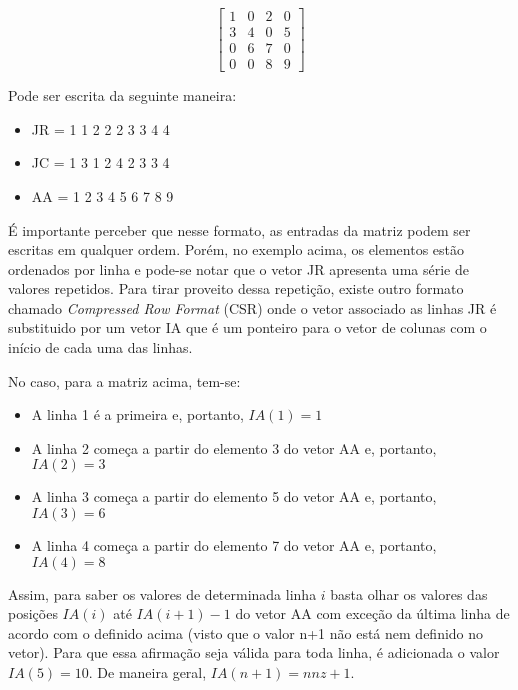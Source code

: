 \begin{equation}
    \begin{bmatrix}
        1 & 0 & 2 & 0\\
        3 & 4 & 0 & 5\\
        0 & 6 & 7 & 0\\
        0 & 0 & 8 &9
    \end{bmatrix}
\end{equation}

Pode ser escrita da seguinte maneira:


\begin{center}
    \begin{itemize}
        \item  JR = 1 1 2 2 2 3 3 4 4
        \item  JC = 1 3 1 2 4 2 3 3 4
        \item  AA = 1 2 3 4 5 6 7 8 9
    \end{itemize}
\end{center}


É importante perceber que nesse formato, as entradas da matriz podem ser escritas em qualquer ordem. Porém, no exemplo acima, os elementos estão ordenados por linha e pode-se notar que o vetor JR apresenta uma série de valores repetidos. Para tirar proveito dessa repetição, existe outro formato chamado \textit{Compressed Row Format} (CSR) onde o vetor associado as linhas JR é substituido por um vetor IA que é um ponteiro para o vetor de colunas com o início de cada uma das linhas.

No caso, para a matriz acima, tem-se:

\begin{itemize}
    \item A linha 1 é a primeira e, portanto, $IA(1) = 1$
    \item A linha 2 começa a partir do elemento 3 do vetor AA e, portanto, $IA(2) = 3$
    \item A linha 3 começa a partir do elemento 5 do vetor AA e, portanto, $IA(3) = 6$
    \item A linha 4 começa a partir do elemento 7 do vetor AA e, portanto, $IA(4) = 8$
\end{itemize}

Assim, para saber os valores de determinada linha $i$ basta olhar os valores das posições $IA(i)$ até $IA(i+1)-1$ do vetor AA com exceção da última linha de acordo com o definido acima (visto que o valor n+1 não está nem definido no vetor). Para que essa afirmação seja válida para toda linha, é adicionada o valor $IA(5) = 10$. De maneira geral, $IA(n+1) = nnz+1$.



